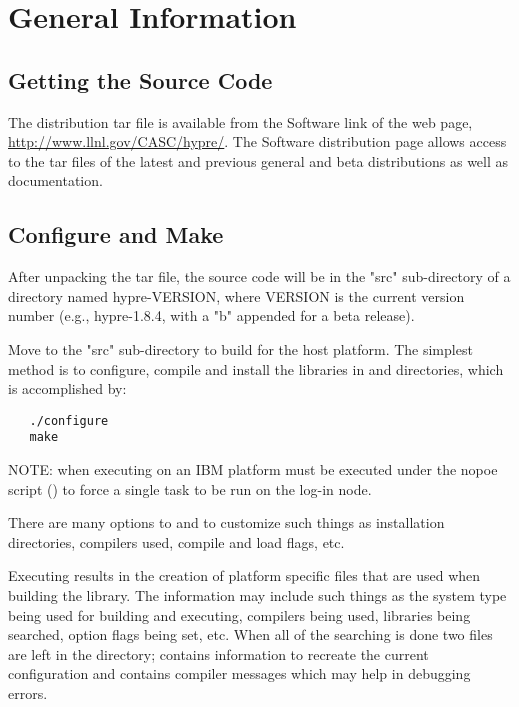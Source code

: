 
\chapter{General Information}


\section{Getting the Source Code}

The \hypre{} distribution tar file is available from the Software link of the
\hypre{} web page, \url{http://www.llnl.gov/CASC/hypre/}.  The \hypre{}
Software distribution page allows access to the tar files of the latest and
previous general and beta distributions as well as documentation.


\section{Configure and Make}

After unpacking the \hypre{} tar file, the source code will be in the "src" 
sub-directory of a directory named hypre-VERSION, where VERSION is the current 
version number (e.g., hypre-1.8.4, with a "b" appended for a beta release).

Move to the "src" sub-directory to build \hypre{} for the host platform.  The 
simplest method is to configure, compile and install the libraries in 
and  directories, which is accomplished by:
\begin{verbatim}
   ./configure
   make
\end{verbatim}

NOTE: when executing on an IBM platform  must be executed under 
the nopoe script () to force a single 
task to be run on the log-in node.

There are many options to  and  to customize such 
things as installation directories, compilers used, compile and load flags, etc.

Executing  results in the creation of platform specific files 
that are used when building the library. The information may include such things
as the system type being used for building and executing, compilers being used, 
libraries being searched, option flags being set, etc.  When all of the searching
is done two files are left in the  directory;  
contains information to recreate the current configuration and 
contains compiler messages which may help in debugging  errors. 


